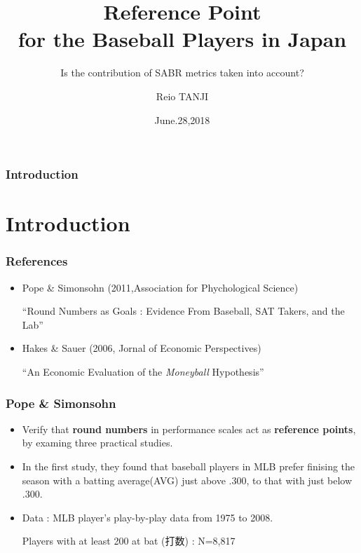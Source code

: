\documentclass[dvipdfmx,12pt]{beamer}
\title{Reference Point \\ for the Baseball Players in Japan}
\subtitle{Is the contribution of SABR metrics taken into account?}
\author{Reio TANJI}
\date{June.28,2018}
\institute{Osaka University}
\begin{document}
\begin{frame}\frametitle{Introduction}
\titlepage
\end{frame}

\section{Introduction}
\begin{frame}\frametitle{References}
 
 \begin{itemize}
  
  \item Pope \& Simonsohn (2011,Association for Phychological Science)
   
  ``Round Numbers as Goals : Evidence From Baseball, SAT Takers, and the Lab''
   
  \item Hakes \& Sauer (2006, Jornal of Economic Perspectives)
   
  ``An Economic Evaluation of the \textit{Moneyball} Hypothesis''
   
  \end{itemize}
 
\end{frame}

\begin{frame}\frametitle{Pope \& Simonsohn}

\begin{itemize}

\item Verify that \textbf{round numbers} in performance scales act as \textbf{reference points}, by examing three practical studies.

\item In the first study, they found that baseball players in MLB prefer finising the season with a batting average(AVG) just above .300, to that with just below .300.

\item Data : MLB player's play-by-play data from 1975 to 2008.

Players with at least 200 at bat (打数) : N=8,817

\end{itemize}

\end{frame}
\end{document}
